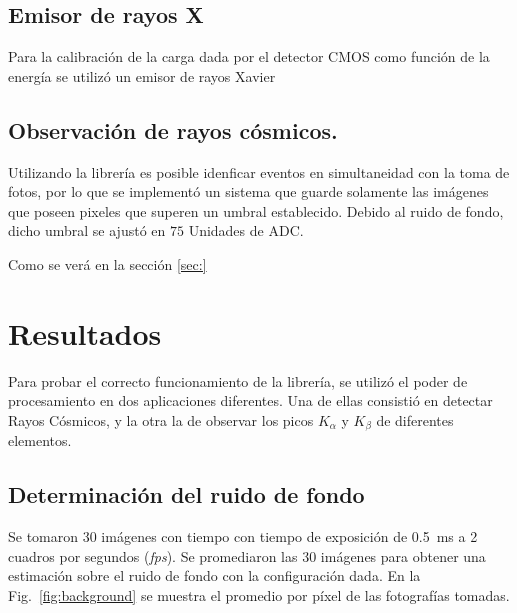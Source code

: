 \documentclass[twoside,twocolumn]{article}
\begin{document}
    \subsection{Emisor de rayos X}
      Para la calibración de la carga dada por el detector CMOS como función de la energía se utilizó un emisor de rayos Xavier
  
    \subsection{Observación de rayos cósmicos.}
      Utilizando la librería es posible idenficar eventos en simultaneidad con la toma de fotos,
      por lo que se implementó un sistema que guarde solamente las imágenes que poseen pixeles que superen un umbral establecido.
      Debido al ruido de fondo, dicho umbral se ajustó en $75$ Unidades de ADC.

      Como se verá en la sección \ref{sec:}
  
  \section{Resultados}\label{sec:results}
    Para probar el correcto funcionamiento de la librería, se utilizó el poder de procesamiento en dos aplicaciones diferentes.
    Una de ellas consistió en detectar Rayos Cósmicos, y la otra la de observar los picos $K_{\alpha}$ y $K_{\beta}$ de diferentes elementos.

    \subsection{Determinación del ruido de fondo}\label{sec:results:background}
      Se tomaron 30 imágenes con tiempo con tiempo de exposición de \SI{0.5}{\milli\second} a 2 cuadros por segundos (\emph{fps}).
      Se promediaron las 30 imágenes para obtener una estimación sobre el ruido de fondo con la configuración dada. 
      En la Fig.~\ref{fig:background} se muestra el promedio por píxel de las fotografías tomadas.
\end{document}
